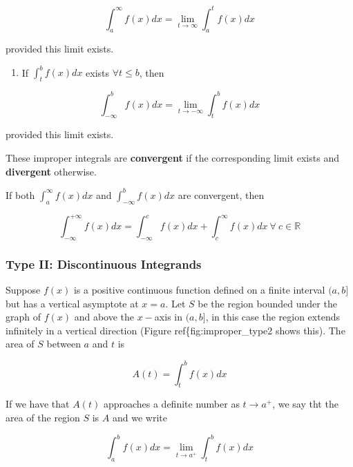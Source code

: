 \documentclass[11pt]{article}
\providecommand{\tightlist}{%
      \setlength{\itemsep}{0pt}\setlength{\parskip}{0pt}}
\begin{document}
{\[
\int^{\infty}_a f(x) dx = \lim_{t\rightarrow\infty}\int^t_a f(x) dx
\]

provided this limit exists.

\begin{enumerate}
\def\labelenumi{\arabic{enumi}.}
\setcounter{enumi}{1}
\tightlist
\item
  If \(\int^b_t f(x) dx\) exists \(\forall t\leq b\), then
\end{enumerate}

\[
\int_{-\infty}^b f(x) dx = \lim_{t\rightarrow -\infty}\int^b_t f(x) dx
\]

provided this limit exists.

These improper integrals are \textbf{convergent} if the corresponding
limit exists and \textbf{divergent} otherwise.

If both \(\int^{\infty}_a f(x) dx\) and \(\int_{-\infty}^b f(x) dx\) are
convergent, then

\[
\int_{-\infty}^{+\infty} f(x) dx = \int_{-\infty}^c f(x) dx + \int^{\infty}_c f(x) dx \ \forall \ c\in\mathbb{R}
\]

    \hypertarget{type-ii-discontinuous-integrands}{%
\subsubsection{Type II: Discontinuous
Integrands}\label{type-ii-discontinuous-integrands}}

Suppose \(f(x)\) is a positive continuous function defined on a finite
interval \((a,b]\) but has a vertical asymptote at \(x=a\). Let \(S\) be
the region bounded under the graph of \(f(x)\) and above the \(x-\)axis
in \((a,b]\), in this case the region extends infinitely in a vertical
direction (Figure ref\{fig:improper\_type2 shows this). The area of
\(S\) between \(a\) and \(t\) is

\[
A(t) = \int^b_t f(x) dx
\]

If we have that \(A(t)\) approaches a definite number as
\(t\rightarrow a^{+}\), we say tht the area of the region \(S\) is \(A\)
and we write

\[
\int^b_a f(x) dx = \lim_{t\rightarrow a^{+}} \int^b_t f(x) dx
\]

    \begin{center}
    \end{center}
    { \hspace*{\fill} \\}
    
}
\end{document}
